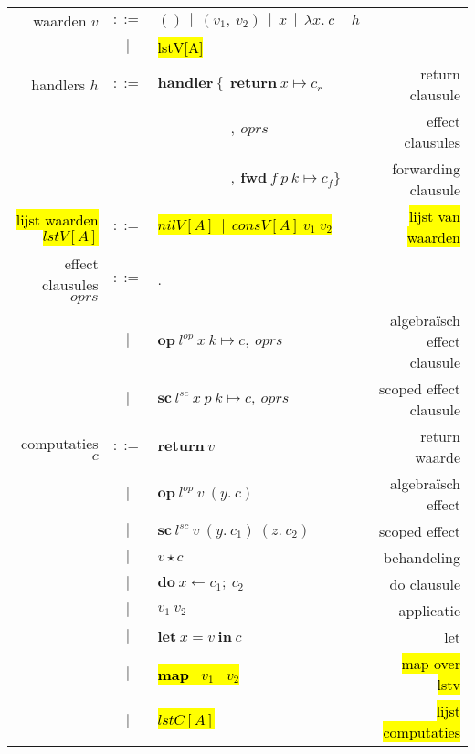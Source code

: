 \begin{table}
    \centering
    \begin{tabular}{|r c l r|}
    \hline 
         waarden $v$ & $::=$ & $() \ \ | \ \ (v_{1}, \ v_{2} ) \ \ | \ \ x \ \ | \ \ \lambda x . \ c \ \ | \ \ h$ & \\
         & $|$ & \hl{lstV[A]} & \\
         handlers $h$ & $::=$ & $\textbf{handler} \ \{ \ \ \textbf{return} \ x \mapsto c_{r}$ & return clausule\\
         & & $\qquad \qquad \quad , \ oprs$ & effect  clausules \\
         & & $\qquad \qquad \quad , \ \textbf{fwd} \ f \ p \ k \mapsto c_{f} \}$ & forwarding clausule \\
         \hl{lijst waarden $lstV[A]$} & $::=$ & \hl{$nilV[A]\  \  | \  \  consV[A] \ 
 v_1 \  v_2$} & \hl{lijst van waarden}\\
          effect clausules $oprs$ & $::=$ & . & \\ 
          & $|$ & $\textbf{op} \ l^{op} \ x \ k \mapsto c, \ oprs$ & algebraïsch effect clausule\\
           & $|$ & $\textbf{sc} \ l^{sc} \ x \ p \ k \mapsto c, \ oprs$ & scoped effect clausule\\
         computaties $c$ & $::=$ & $\textbf{return} \ v$ & return waarde \\
          & $|$ & $\textbf{op} \ l^{op} \ v \ (y. \ c)$ & algebraïsch effect \\
          & $|$ & $\textbf{sc} \ l^{sc} \ v \ (y. \ c_{1}) \ (z. \ c_{2})$ & scoped effect \\
          & $|$ & $v \star c$ & behandeling \\
          & $|$ & $\textbf{do} \ x \leftarrow c_{1}; \ c_{2}$ & do clausule \\
          & $|$ & $v_{1} \ v_{2}$ & applicatie \\
          & $|$ & $\textbf{let} \ x = v \ \textbf{in} \ c$ & let \\
          & $|$ & \hl{\textbf{map} \ $v_1$ \ $v_2$} & \hl{map over lstv} \\
          & $|$ & \hl{$lstC[A]$} & \hl{lijst computaties} \\

\end{tabular}
\end{table}
